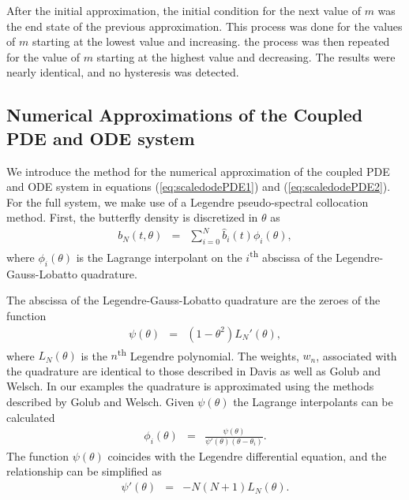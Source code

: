 \documentclass[review,authoryear]{elsarticle}
\begin{document}
After the initial approximation, the initial condition for the next
value of $m$ was the end state of the previous approximation. This
process was done for the values of $m$ starting at the lowest value
and increasing. the process was then repeated for the value of $m$
starting at the highest value and decreasing. The results were nearly
identical, and no hysteresis was detected.
\subsection{Numerical Approximations of the Coupled PDE and ODE system}
\label{numericalApproximation}

We introduce the method for the numerical approximation of the coupled
PDE and ODE system in equations (\ref{eq:scaledodePDE1}) and
(\ref{eq:scaledodePDE2}). For the full system, we make use of a
Legendre pseudo-spectral collocation
method\citep{spectralMethodsFluids,hesthaven_gottlieb_gottlieb_2007,gottlieb1977numerical}. First,
the butterfly density is discretized in $\theta$ as
\begin{eqnarray}
  \label{eqn:spatialDiscretization}
  b_N(t,\theta) & = & \sum^N_{i=0} \hat{b}_i(t) \phi_i(\theta),
\end{eqnarray}
where $\phi_i(\theta)$ is the Lagrange interpolant on the
$i$\textsuperscript{th} abscissa of the Legendre-Gauss-Lobatto
quadrature\citep{hesthaven_gottlieb_gottlieb_2007}.

The abscissa of the Legendre-Gauss-Lobatto quadrature are the zeroes
of the function
\begin{eqnarray}
  \psi(\theta) & = & \left(1-\theta^2\right) L_{N}'(\theta),
\end{eqnarray}
where $L_N(\theta)$ is the $n$\textsuperscript{th} Legendre
polynomial\citep{davis2007methods}.  The weights, $w_n$, associated
with the quadrature are identical to those described in
Davis\citep{davis2007methods} as well as Golub and
Welsch\citep{gaussQuadratureRules}. In our examples the quadrature is
approximated using the methods described by Golub and
Welsch\citep{gaussQuadratureRules}.  Given $\psi(\theta)$ the Lagrange
interpolants can be calculated
\begin{eqnarray}
  \phi_i(\theta) & = & \frac{\psi(\theta)}{\psi'(\theta)(\theta-\theta_i)}.
\end{eqnarray}
The function $\psi(\theta)$ coincides with the Legendre differential
equation, and the relationship can be simplified as
\begin{eqnarray}
  \psi'(\theta) & = & -N(N+1)L_N(\theta).
\end{eqnarray}
\end{document}
